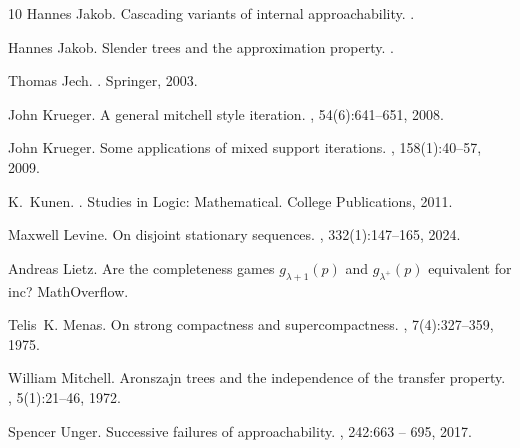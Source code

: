 \documentclass[12pt]{amsart}
\theoremstyle{definition}
\theoremstyle{remark}
\theoremstyle{plain}
\numberwithin{mydef}{section}
\begin{document}
\begin{thebibliography}{10}
		Hannes Jakob.
		\newblock Cascading variants of internal approachability.
		.
		
		Hannes Jakob.
		\newblock Slender trees and the approximation property.
		.
		
		Thomas Jech.
		.
		\newblock Springer, 2003.
		
		John Krueger.
		\newblock A general mitchell style iteration.
		, 54(6):641--651, 2008.
		
		John Krueger.
		\newblock Some applications of mixed support iterations.
		, 158(1):40--57, 2009.
		
		K.~Kunen.
		.
		\newblock Studies in Logic: Mathematical. College Publications, 2011.
		
		Maxwell Levine.
		\newblock On disjoint stationary sequences.
		, 332(1):147--165, 2024.
		
		Andreas Lietz.
		\newblock Are the completeness games $g_{\lambda+1}(p)$ and $g_{\lambda^+}(p)$
		equivalent for inc?
		\newblock MathOverflow.
		
		Telis~K. Menas.
		\newblock On strong compactness and supercompactness.
		, 7(4):327--359, 1975.
		
		William Mitchell.
		\newblock Aronszajn trees and the independence of the transfer property.
		, 5(1):21--46, 1972.
		
		Spencer Unger.
		\newblock Successive failures of approachability.
		, 242:663 -- 695, 2017.
		
	\end{thebibliography}
\end{document}
